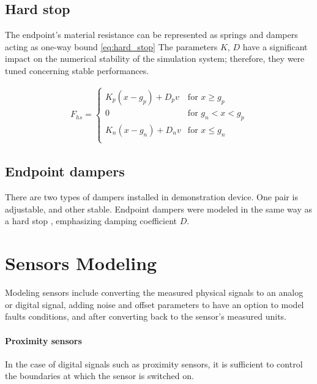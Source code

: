 \subsection{Hard stop}
The endpoint's material resistance can be represented as springs and
dampers acting as one-way bound \ref{eq:hard_stop}
The parameters $K$, $D$  have a significant impact on the numerical stability
of the simulation system; therefore, they were tuned concerning stable
performances.

\begin{align}
    F_{hs} =
    \begin{cases}
        K_p(x-g_p) + D_pv & \text{for } x \ge g_p \\
        0 & \text{for } g_n < x < g_p \\
        K_n(x-g_n) + D_nv & \text{for } x \le g_n \\
    \end{cases}
    \label{eq:hard_stop}
\end{align}


\subsection{Endpoint dampers}
There are two types of dampers installed in demonstration device. One pair
is adjustable, and other stable.  Endpoint dampers were modeled in the same
way as a hard stop \label{eq:hard_stop}, emphasizing damping coefficient
$D$. 

\section{Sensors Modeling}
Modeling sensors include converting the measured physical signals to an
analog or digital signal, adding noise and offset parameters to have an
option to model faults conditions, and after converting back to the
sensor's measured units. 

\paragraph{Proximity sensors} In the case of digital signals such as
proximity sensors, it is sufficient to control the boundaries at which the
sensor is switched on.


